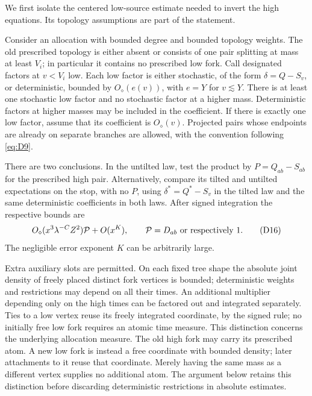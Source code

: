 We first isolate the centered low-source estimate needed to invert the
high equations.  Its topology assumptions are part of the statement.
\begin{lemma}\label{lem:statistics-low-sources}
Consider an allocation with bounded degree and bounded topology
weights.  The old prescribed topology is either absent or consists of
one pair splitting at mass at least $V_i$; in particular it contains no
prescribed low fork.  Call designated factors at $v<V_i$ low.
Each low factor is either stochastic, of the form $\delta=Q-S_v$,
or deterministic, bounded by $O_\diamond(e(v))$, with $e=Y$ for
$v\lesssim Y$.  There is at least one stochastic low factor and no
stochastic factor at a higher mass.  Deterministic factors at higher
masses may be included in the coefficient.  If there is exactly one
low factor, assume that its coefficient is $O_\diamond(v)$.
Projected pairs whose endpoints are already on separate branches are
allowed, with the convention following \eqref{eq:D9}.

There are two conclusions.  In the untilted law, test the product by
$P=Q_{ab}-S_{ab}$ for the prescribed high pair.  Alternatively, compare
its tilted and untilted expectations on the stop, with no $P$, using
$\delta^*=Q^*-S_v$ in the tilted law and the same deterministic
coefficients in both laws.  After signed integration the respective
bounds are
\begin{equation}
 O_\diamond(x^3\lambda^{-C}Z^2){\cal P}+O(x^K),
 \qquad {\cal P}=D_{ab}\ \hbox{or respectively }1.                 \tag{D16}\label{eq:D16}
\end{equation}
The negligible error exponent $K$ can be arbitrarily large.

Extra auxiliary slots are permitted.  On each fixed tree shape the
absolute joint density of freely placed distinct fork vertices is
bounded; deterministic weights and restrictions may depend on all
their times.  An additional multiplier depending only on the high
times can be factored out and integrated separately.  Ties to a low
vertex reuse its freely integrated coordinate, by the signed rule;
no initially free low fork requires an atomic time measure.
This distinction concerns the underlying allocation measure.  The old
high fork may carry its prescribed atom.  A new low fork is instead a
free coordinate with bounded density; later attachments to it reuse that
coordinate.  Merely having the same mass as a different vertex supplies
no additional atom.  The argument below retains this distinction before
discarding deterministic restrictions in absolute estimates.

\end{lemma}
